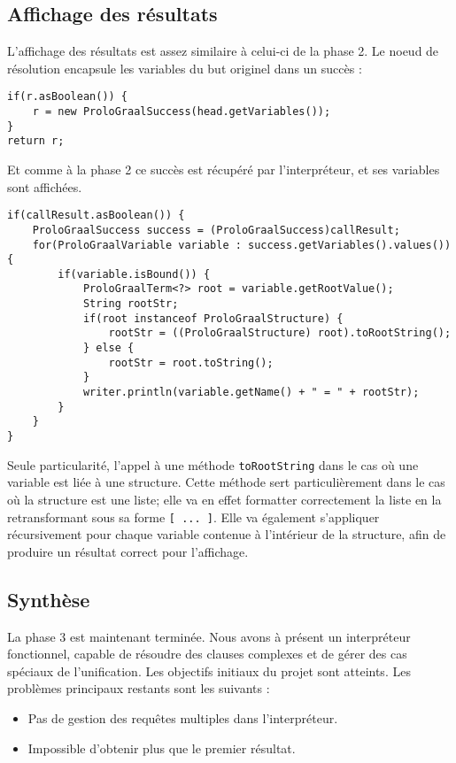 \documentclass[../report.tex]{subfiles}
\begin{document}
\subsection{Affichage des résultats}
L'affichage des résultats est assez similaire à celui-ci de la phase 2. Le noeud de résolution encapsule les variables du but originel dans un succès :
\begin{verbatim}
if(r.asBoolean()) {
    r = new ProloGraalSuccess(head.getVariables());
}
return r;
\end{verbatim}
Et comme à la phase 2 ce succès est récupéré par l'interpréteur, et ses variables sont affichées.
\begin{verbatim}
if(callResult.asBoolean()) {
    ProloGraalSuccess success = (ProloGraalSuccess)callResult;
    for(ProloGraalVariable variable : success.getVariables().values()) {
        if(variable.isBound()) {
            ProloGraalTerm<?> root = variable.getRootValue();
            String rootStr;
            if(root instanceof ProloGraalStructure) {
                rootStr = ((ProloGraalStructure) root).toRootString();
            } else {
                rootStr = root.toString();
            }
            writer.println(variable.getName() + " = " + rootStr);
        }
    }
}
\end{verbatim}
Seule particularité, l'appel à une méthode \texttt{toRootString} dans le cas où une variable est liée à une structure. Cette méthode sert particulièrement dans le cas où la structure est une liste; elle va en effet formatter correctement la liste en la retransformant sous sa forme \texttt{[ ... ]}. Elle va également s'appliquer récursivement pour chaque variable contenue à l'intérieur de la structure, afin de produire un résultat correct pour l'affichage.
\subsection{Synthèse}
La phase 3 est maintenant terminée. Nous avons à présent un interpréteur fonctionnel, capable de résoudre des clauses complexes et de gérer des cas spéciaux de l'unification. Les objectifs initiaux du projet sont atteints. Les problèmes principaux restants sont les suivants :
\begin{itemize}
    \item Pas de gestion des requêtes multiples dans l'interpréteur.
    \item Impossible d'obtenir plus que le premier résultat.
\end{itemize}
\end{document}
